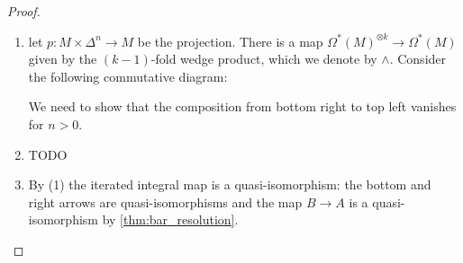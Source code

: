 \documentclass{scrartcl}
\theoremstyle{plain}
\theoremstyle{definition}
\newcommand{\Z}{\mathbb Z}
\DeclareMathOperator{\id}{id}
\begin{document}
\begin{proof}
    \begin{enumerate}
        \item let $p\colon M\times\Delta^n\to M$ be the projection. There is a map $\Omega^*(M)^{\otimes k}\to \Omega^*(M)$ given by the $(k-1)$-fold wedge product, which we denote by $\wedge$. Consider the following commutative diagram:
\begin{center}
\end{center}
We need to show that the composition from bottom right to top left vanishes for $n>0$. 

\item TODO

\item By (1) the iterated integral map is a quasi-isomorphism: the bottom and right arrows are quasi-isomorphisms and the map $B\to A$ is a quasi-isomorphism by \cref{thm:bar_resolution}. 
\end{enumerate}
\end{proof}
\end{document}
